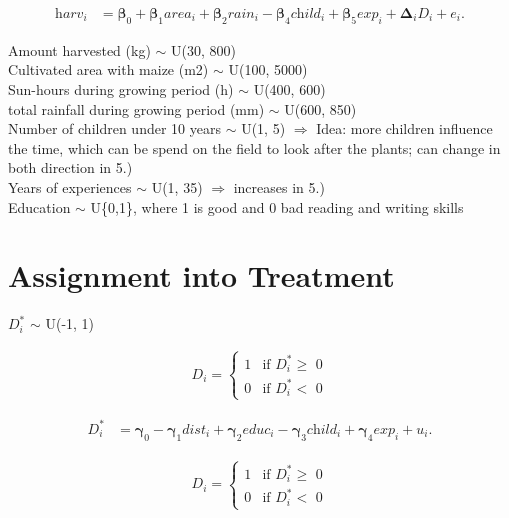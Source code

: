 \begin{align}
	\label{eq:eq1}
	\textit{harv}_i &= \boldsymbol{\beta}_0 + \boldsymbol{\beta}_1 \textit{area}_i + \boldsymbol{\beta}_2 \textit{rain}_i - \boldsymbol{\beta}_4 \textit{child}_i + \boldsymbol{\beta}_5 \textit{exp}_i + \boldsymbol{\Delta}_i \textit{D}_i + \textit{e}_i.
\end{align}

Amount harvested (kg)  $\sim$ U(30, 800)  \\
Cultivated area with maize (m2) $\sim$ U(100, 5000) \\
Sun-hours during growing period (h) $\sim$ U(400, 600) \\
total rainfall during growing period (mm) $\sim$ U(600, 850) \\
Number of children under 10 years $\sim$ U(1, 5)  $\Rightarrow$ Idea: more children influence the time, which can be spend on the field to look after the plants; can change in both direction in 5.) \\
Years of experiences $\sim$ U(1, 35) $\Rightarrow$ increases in 5.) \\
Education $\sim$ U\{0,1\}, where 1 is good and 0 bad reading and writing skills \\


\section{Assignment into Treatment} \label{sec:assignment}

$\textit{D}_i^\ast$ $\sim$ U(-1, 1)

\begin{align*}
  \textit{D}_i =
    \begin{cases}
      1 & \text{if $\textit{D}_i^\ast \geq$ 0}\\
      0 & \text{if $\textit{D}_i^\ast <$ 0}
    \end{cases}       
\end{align*}

\begin{align}
	\label{eq:eq1}
	\textit{D}_i^\ast &= \boldsymbol{\gamma}_0 - \boldsymbol{\gamma}_1 \textit{dist}_i + \boldsymbol{\gamma}_2 \textit{educ}_i -  \boldsymbol{\gamma}_3 \textit{child}_i + \boldsymbol{\gamma}_4 \textit{exp}_i  + \textit{u}_i.
\end{align}

 

\begin{align*}
  \textit{D}_i =
    \begin{cases}
      1 & \text{if $\textit{D}_i^\ast \geq$ 0}\\
      0 & \text{if $\textit{D}_i^\ast <$ 0}
    \end{cases}       
\end{align*}

